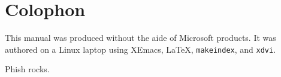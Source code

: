 \chapter{Colophon}

This manual was produced without the aide of Microsoft products.
It was authored on a Linux laptop using XEmacs, \LaTeX{},
\texttt{makeindex}, and \texttt{xdvi}.

\rule{0pt}{17em}

\begin{flushright}
Phish rocks.
\end{flushright}
